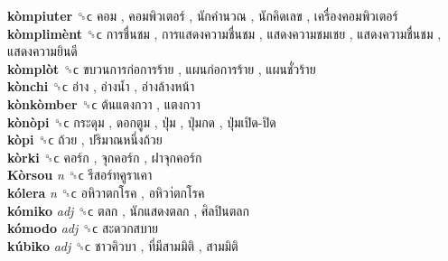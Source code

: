 \textbf{kòmpiuter} ␝ϲ   คอม ,  คอมพิวเตอร์ ,  นักคำนวณ ,  นักคิดเลข ,  เครื่องคอมพิวเตอร์   \\
\textbf{kòmplimènt} ␝ϲ   การชื่นชม ,  การแสดงความชื่นชม ,  แสดงความชมเชย ,  แสดงความชื่นชม ,  แสดงความยินดี   \\
\textbf{kòmplòt} ␝ϲ   ขบวนการก่อการร้าย ,  แผนก่อการร้าย ,  แผนชั่วร้าย   \\
\textbf{kònchi} ␝ϲ   อ่าง ,  อ่างน้ำ ,  อ่างล้างหน้า   \\
\textbf{kònkòmber} ␝ϲ   ต้นแตงกวา ,  แตงกวา   \\
\textbf{kònòpi} ␝ϲ   กระดุม ,  ดอกตูม ,  ปุ่ม ,  ปุ่มกด ,  ปุ่มเปิด-ปิด   \\
\textbf{kòpi} ␝ϲ   ถ้วย ,  ปริมาณหนึ่งถ้วย   \\
\textbf{kòrki} ␝ϲ   คอร์ก ,  จุกคอร์ก ,  ฝาจุกคอร์ก   \\
\textbf{Kòrsou} \emph{n}  ␝ϲ   รีสอร์ทคูราเคา   \\
\textbf{kólera} \emph{n}  ␝ϲ   อหิวาตกโรค ,  อหิวา่ตกโรค   \\
\textbf{kómiko} \emph{adj}  ␝ϲ   ตลก ,  นักแสดงตลก ,  ศิลปินตลก   \\
\textbf{kómodo} \emph{adj}  ␝ϲ   สะดวกสบาย   \\
\textbf{kúbiko} \emph{adj}  ␝ϲ   ชาวคิวบา ,  ที่มีสามมิติ ,  สามมิติ   \\
